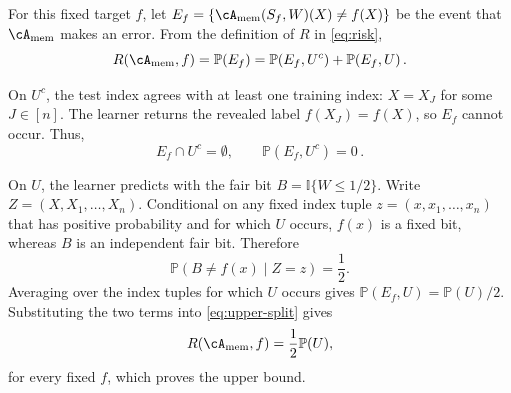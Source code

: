 \documentclass[11pt,twoside]{article}
\newcommand{\I}{\mathbb I}
\renewcommand{\P}{\mathbb P}
\newcommand{\cAmem}{\cA_{\mathrm{mem}}}
\theoremstyle{definition}
\theoremstyle{remark}
\begin{document}
For this fixed target $f$, let
$E_f=\{\cAmem(S_f,W)(X)\ne f(X)\}$
be the event that $\cAmem$ makes an error. From the definition of $R$ in
\cref{eq:risk},
\begin{equation}
R(\cAmem,f)
=\P(E_f)
=\P(E_f,U^c)+\P(E_f,U)\,.
\label{eq:upper-split}
\end{equation}

On $U^c$, the test index agrees with at least one training index: $X=X_J$ for
some $J\in[n]$. The learner returns the revealed label
$f(X_J)=f(X)$, so $E_f$ cannot occur. Thus,
\[
E_f\cap U^c=\emptyset,
\qquad
\P(E_f,U^c)=0\,.
\]

On $U$, the learner predicts with the fair bit
$B=\I\{W\le 1/2\}$.
Write $Z=(X,X_1,\ldots,X_n)$.
Conditional on any fixed index tuple $z=(x,x_1,\ldots,x_n)$ that has positive
probability and for which $U$ occurs, $f(x)$ is a fixed bit, whereas $B$ is an
independent fair bit.
Therefore
\[
\P(B\ne f(x)\mid Z=z)=\frac12.
\]
Averaging over the index tuples for which $U$ occurs gives
$\P(E_f,U)=\P(U)/2$. Substituting the two terms into
\cref{eq:upper-split} gives
\begin{equation}
R(\cAmem,f)=\frac12\P(U),
\label{eq:upper-bound}
\end{equation}
for every fixed $f$, which proves the upper bound.
\end{document}
